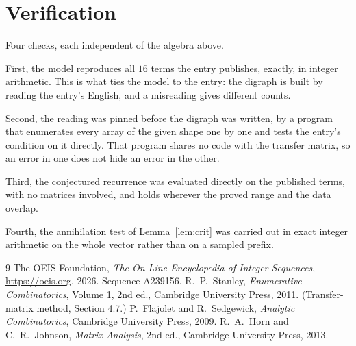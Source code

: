 \documentclass[11pt,a4paper]{article}
\theoremstyle{plain}
\theoremstyle{definition}
\begin{document}
\section{Verification}

Four checks, each independent of the algebra above.

First, the model reproduces all $16$ terms the entry publishes, exactly, in integer
arithmetic. This is what ties the model to the entry: the digraph is built by reading the
entry's English, and a misreading gives different counts.

Second, the reading was pinned before the digraph was written, by a program that enumerates
every array of the given shape one by one and tests the entry's condition on it directly. That program shares no code with the transfer matrix, so an error in one does not
hide an error in the other.

Third, the conjectured recurrence was evaluated directly on the published terms, with no
matrices involved, and holds wherever the proved range and the data overlap.

Fourth, the annihilation test of Lemma~\ref{lem:crit} was carried out in exact integer
arithmetic on the whole vector rather than on a sampled prefix.

\begin{thebibliography}{9}
 The OEIS Foundation, \emph{The On-Line Encyclopedia of Integer
Sequences}, \url{https://oeis.org}, 2026. Sequence A239156.
 R.~P.~Stanley, \emph{Enumerative Combinatorics}, Volume 1, 2nd ed.,
Cambridge University Press, 2011. (Transfer-matrix method, Section 4.7.)
 P.~Flajolet and R.~Sedgewick, \emph{Analytic Combinatorics}, Cambridge
University Press, 2009.
 R.~A.~Horn and C.~R.~Johnson, \emph{Matrix Analysis}, 2nd ed., Cambridge
University Press, 2013.
\end{thebibliography}
\end{document}
